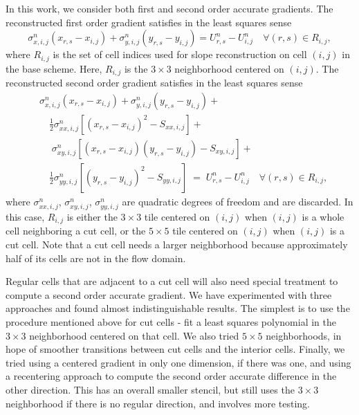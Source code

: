In this work, we consider both first and second order accurate 
gradients.  The reconstructed first order gradient satisfies in the 
least squares sense
\begin{equation}\label{eqn:linrecon_base}
\sigma^n_{x,i,j}(x_{r,s} - x_{i,j}) +
\sigma^n_{y,i,j}(y_{r,s} - y_{i,j})=
U^n_{r,s} - U^n_{i, j} \quad \forall (r,s) \in R_{i,j},
\end{equation}
where $R_{i,j}$ is the set of cell indices used for slope reconstruction on cell $(i,j)$ in the 
base scheme.  Here, $R_{i,j}$ is the $3\times 3$ neighborhood  centered on $(i,j)$.
The reconstructed second order gradient satisfies in the least squares sense
\begin{equation}
\begin{aligned}\label{eqn:linrecon_base2}
&\sigma^n_{x,i,j}(x_{r,s} - x_{i,j}) +
\sigma^n_{y,i,j}(y_{r,s} - y_{i,j})  + \\
&\quad \frac{1}{2}\sigma^n_{xx,i,j}[(x_{r,s} - x_{i,j})^2 - S_{xx,i,j}]  + \\
& \quad \; \sigma^n_{xy,i,j}[(x_{r,s} - x_{i,j})(y_{r,s} - y_{i,j})-S_{xy,i,j}] +\\
&\quad  \frac{1}{2}\sigma^n_{yy,i,j}[(y_{r,s} - y_{i,j})^2 - S_{yy,i,j}]
 \; = \;  U^n_{r,s} - U^n_{i, j} \quad \forall (r,s) \in R_{i,j},
\end{aligned}
\end{equation}
where $\sigma^n_{xx,i,j}$, $\sigma^n_{xy,i,j}$, $\sigma^n_{yy,i,j}$ 
are quadratic degrees of freedom and are discarded.  In this case, $R_{i,j}$ is either the $3\times 3$ tile centered on $(i,j)$ when $(i,j)$ is a whole cell neighboring a cut cell, or the $5\times 5$ tile centered on $(i,j)$ when $(i,j)$ is a cut cell.
Note that a cut cell needs a larger neighborhood because 
approximately half of its cells are not in the flow domain.  

Regular cells that are adjacent to a cut cell will also need special treatment to
compute a second order accurate gradient. We have experimented with three  approaches
and found almost indistinguishable results. The simplest is to use the 
procedure mentioned above for cut cells
- fit a least squares polynomial in the $3 \times 3$ neighborhood centered on that cell.
We also tried $5 \times 5$ neighborhoods, in hope of smoother transitions between cut cells
and the interior cells.  Finally, we tried using a centered
gradient in only one dimension, if there was one, and using a recentering approach to 
compute the second order accurate difference in the other direction.  This has an overall
smaller stencil, but still uses the $3 \times 3$ neighborhood
if there is no regular direction,
and involves more testing.  

